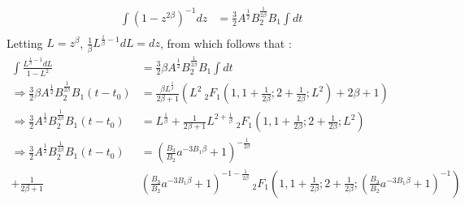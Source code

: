 \documentclass[a4paper, 11pt]{FSKH_623_Report}
\numberwithin{equation}{section}
\newcommand{\brac}[1]{\left(#1\right)}
\begin{document}
\begin{equation}\label{eq:B11}
\begin{split}
\int \brac{1-z^{2\beta}}^{-1}dz&= \frac{3}{2}A^{\frac{1}{2}}B_{2}^{\frac{1}{2\beta}}B_{1} \int dt \\
\end{split}
\end{equation}
Letting $L=z^{\beta}$, $\frac{1}{\beta}L^{\frac{1}{\beta}-1}dL=dz$, from which follows that :
\begin{equation}\label{eq:B12}
\begin{split}
\int \frac{L^{\frac{1}{\beta}-1}dL}{1-L^{2}}&= \frac{3}{2}\beta A^{\frac{1}{2}}B_{2}^{\frac{1}{2\beta}}B_{1} \int dt \\
\Rightarrow\frac{3}{2}\beta A^{\frac{1}{2}}B_{2}^{\frac{1}{2\beta}}B_{1}\brac{t-t_{0}}&=\frac{\beta L^{\frac{1}{\beta}}}{2\beta+1}\brac{L^{2}\ _{2}F_{1}\brac{1,1+\frac{1}{2\beta};2+\frac{1}{2\beta};L^{2}}+2\beta+1}\\
\Rightarrow\frac{3}{2}A^{\frac{1}{2}}B_{2}^{\frac{1}{2\beta}}B_{1}\brac{t-t_{0}}&={L^{\frac{1}{\beta}}}+\frac{1}{2\beta+1}L^{2+\frac{1}{\beta}}\ _{2}F_{1}\brac{1,1+\frac{1}{2\beta};2+\frac{1}{2\beta};L^{2}}\\
\Rightarrow\frac{3}{2}A^{\frac{1}{2}}B_{2}^{\frac{1}{2\beta}}B_{1}\brac{t-t_{0}}&=\brac{\frac{B_{3}}{B_{2}}a^{-3B_{1}\beta}+1}^{-\frac{1}{2\beta}}\\
+\frac{1}{2\beta+1}&\brac{\frac{B_{3}}{B_{2}}a^{-3B_{1}\beta}+1}^{-1-\frac{1}{2\beta}}\ _{2}F_{1}\brac{1,1+\frac{1}{2\beta};2+\frac{1}{2\beta};\brac{\frac{B_{3}}{B_{2}}a^{-3B_{1}\beta}+1}^{-1}}\\
\end{split}
\end{equation}
\end{document}
